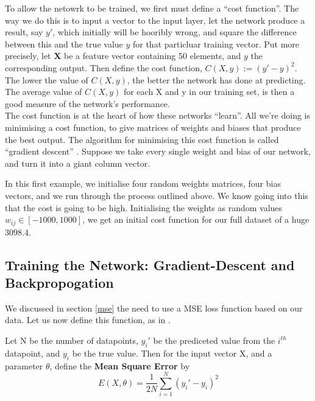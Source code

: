To allow the netowrk to be trained, we first must define a ``cost function''. The way we do this is to input a vector to the input layer, let the network produce a result, say $y'$, which
initially will be hooribly wrong, and square the difference between this and the true value $y$ for that particluar training vector. Put more precisely,
let \textbf{X} be a feature vector containing 50 elements, and $y$ the corresponding output. Then define the cost function, $C(X,y) := (y'-y)^2$. The lower the value of $C(X,y)$, the 
better the network has done at predicting. The average value of $C(X,y)$ for each X and y in our training set, is then a good measure of the network's performance. \\

The cost function is at the heart of how these networks ``learn''. All we're doing is minimising a cost function, to give matrices of weights and biases that
produce the best output. The algorithm for minimising this cost function is called ``gradient descent'' \cite{cauchy}. Suppose we take every single weight and bias of our network,
and turn it into a giant column vector. 

\begin{example}
    In this first example, we initialise four random weights matrices, four bias vectors, and we run through the process outlined above. We know going into this that 
    the cost is going to be high. Initialising the weights as random values $w_{ij} \in [-1000,1000]$, we get an initial cost function for our full dataset of a huge
    3098.4. 
\end{example}

\subsection{Training the Network: Gradient-Descent and Backpropogation}

We discussed in section \ref{mse} the need to use a MSE loss function based on our data. Let us now define this function, as in \cite{huber}.

\begin{definition}
    Let N be the number of datapoints, $y_i'$ be the prediceted value from the $i^{th}$ datapoint, and $y_i$ be the true value. Then for the input vector X, and a parameter $\theta$,
    define the \textbf{Mean Square Error} by
    \begin{equation}
        E(X,\theta) = \frac{1}{2N}\sum^N_{i=1}(y_i'-y_i)^2
    \end{equation}
\end{definition}

